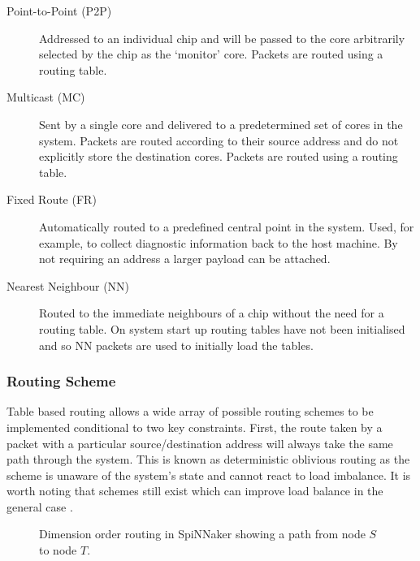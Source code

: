 			\begin{description}
				
				\item[Point-to-Point (P2P)] Addressed to an individual chip and will be
				passed to the core arbitrarily selected by the chip as the `monitor'
				core. Packets are routed using a routing table.
				
				\item[Multicast (MC)] Sent by a single core and delivered to a
				predetermined set of cores in the system. Packets are routed according
				to their source address and do not explicitly store the destination
				cores. Packets are routed using a routing table.
				
				\item[Fixed Route (FR)] Automatically routed to a predefined central
				point in the system. Used, for example, to collect diagnostic
				information back to the host machine. By not requiring an address a
				larger payload can be attached.
				
				\item[Nearest Neighbour (NN)] Routed to the immediate neighbours of a
				chip without the need for a routing table. On system start up routing
				tables have not been initialised and so NN packets are used to initially
				load the tables.
				
			\end{description}
			
			\subsubsection{Routing Scheme}
				
				
				Table based routing allows a wide array of possible routing schemes to
				be implemented conditional to two key constraints. First, the route
				taken by a packet with a particular source/destination address will
				always take the same path through the system. This is known as
				deterministic oblivious routing as the scheme is unaware of the system's
				state and cannot react to load imbalance. It is worth noting that
				schemes still exist which can improve load balance in the general case
				\cite{singh02}.
				
				\begin{figure}
					\center
					
					\caption[Dimension order routing in SpiNNaker.]{Dimension order routing
					in SpiNNaker showing a path from node $S$ to node $T$.}
					\label{fig:dimension-order-routing}
				\end{figure}
				
